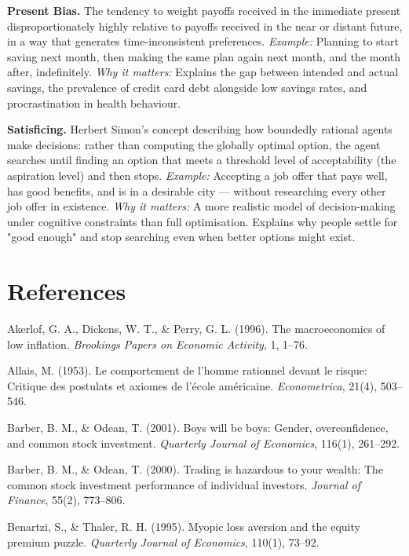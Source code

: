\documentclass[12pt, letterpaper]{article}
\begin{document}
\textbf{Present Bias.} The tendency to weight payoffs received in the immediate present disproportionately highly relative to payoffs received in the near or distant future, in a way that generates time-inconsistent preferences. \textit{Example:} Planning to start saving next month, then making the same plan again next month, and the month after, indefinitely. \textit{Why it matters:} Explains the gap between intended and actual savings, the prevalence of credit card debt alongside low savings rates, and procrastination in health behaviour.

\textbf{Satisficing.} Herbert Simon's concept describing how boundedly rational agents make decisions: rather than computing the globally optimal option, the agent searches until finding an option that meets a threshold level of acceptability (the aspiration level) and then stops. \textit{Example:} Accepting a job offer that pays well, has good benefits, and is in a desirable city --- without researching every other job offer in existence. \textit{Why it matters:} A more realistic model of decision-making under cognitive constraints than full optimisation. Explains why people settle for "good enough" and stop searching even when better options might exist.

\medskip


\section*{References}


Akerlof, G. A., Dickens, W. T., \& Perry, G. L. (1996). The macroeconomics of low inflation. \textit{Brookings Papers on Economic Activity}, 1, 1--76.

Allais, M. (1953). Le comportement de l'homme rationnel devant le risque: Critique des postulats et axiomes de l'école américaine. \textit{Econometrica}, 21(4), 503--546.

Barber, B. M., \& Odean, T. (2001). Boys will be boys: Gender, overconfidence, and common stock investment. \textit{Quarterly Journal of Economics}, 116(1), 261--292.

Barber, B. M., \& Odean, T. (2000). Trading is hazardous to your wealth: The common stock investment performance of individual investors. \textit{Journal of Finance}, 55(2), 773--806.

Benartzi, S., \& Thaler, R. H. (1995). Myopic loss aversion and the equity premium puzzle. \textit{Quarterly Journal of Economics}, 110(1), 73--92.
\end{document}
